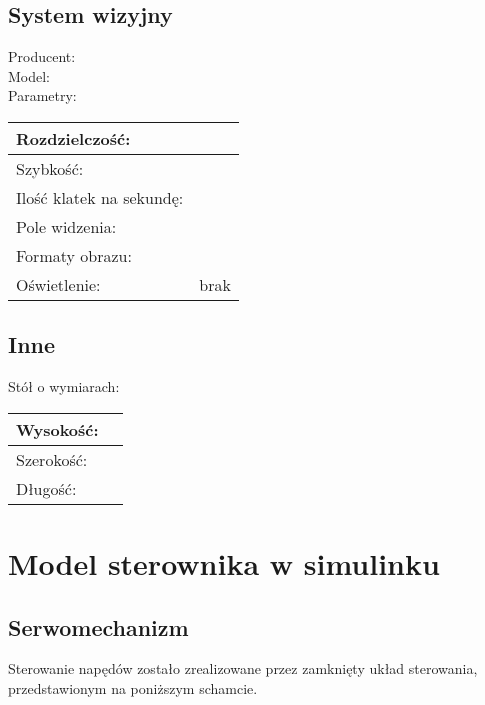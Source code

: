 \subsection{System wizyjny}
\noindent Producent:\\
Model:\\
Parametry:\\
\noindent \begin{tabular}{|l|l|} \hline
{Rozdzielczość: }& \\ \hline
{Szybkość: } &\\ \hline
{Ilość klatek na sekundę: }&\\ \hline
{Pole widzenia: }&\\ \hline
{Formaty obrazu: }& \\ \hline
{Oświetlenie: }& {brak} \\ \hline
\end{tabular}
\subsection{Inne}
\noindent Stół o wymiarach:\\
\begin{tabular}{|l|l|}\hline
Wysokość: & \\ \hline
Szerokość: & \\ \hline
Długość: & \\ \hline
\end{tabular}
\section{Model sterownika w simulinku}
\label{sec:modelWSimulinku}

\subsection{Serwomechanizm}
\label{subsec:Serwomechanizm}

Sterowanie napędów zostało zrealizowane przez zamknięty układ sterowania, przedstawionym na poniższym schamcie. 



